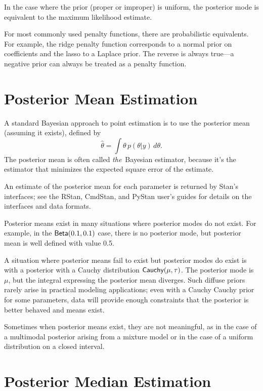 In the case where the prior (proper or improper) is uniform, the
posterior mode is equivalent to the maximum likelihood estimate.

For most commonly used penalty functions, there are probabilistic
equivalents.  For example, the ridge penalty function corresponds to a
normal prior on coefficients and the lasso to a Laplace prior.  The
reverse is always true---a negative prior can always be treated as a
penalty function.



\section{Posterior Mean Estimation}

A standard Bayesian approach to point estimation is to use the
posterior mean (assuming it exists), defined by
%
\[
\hat{\theta} = \int \theta \, p(\theta|y) \, d\theta.
\]
%
The posterior mean is often called {\it the}\ Bayesian estimator,
because it's the estimator that minimizes the expected square error of
the estimate.

An estimate of the posterior mean for each parameter is returned by
Stan's interfaces;  see the RStan, CmdStan, and PyStan user's guides
for details on the interfaces and data formats.  

Posterior means exist in many situations where posterior
modes do not exist.  For example, in the $\distro{Beta}(0.1, 0.1)$
case, there is no posterior mode, but posterior mean is well defined
with value 0.5.  

A situation where posterior means fail to exist but posterior modes do
exist is with a posterior with a Cauchy distribution
$\distro{Cauchy}(\mu,\tau)$.  The posterior mode is $\mu$, but the
integral expressing the posterior mean diverges.  Such diffuse priors
rarely arise in practical modeling applications; even with a Cauchy
Cauchy prior for some parameters, data will provide enough constraints
that the posterior is better behaved and means exist.

Sometimes when posterior means exist, they are not meaningful, as in
the case of a multimodal posterior arising from a mixture model or in
the case of a uniform distribution on a closed interval.  


\section{Posterior Median Estimation}

